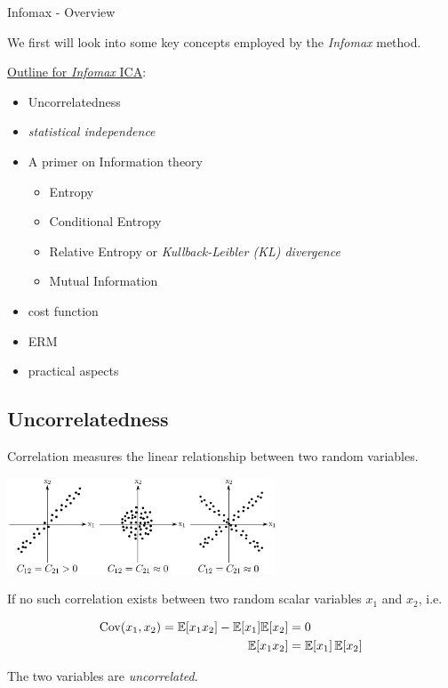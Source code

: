 \begin{frame}{Infomax - Overview}

We first will look into some key concepts employed by the \emph{Infomax} method.

\clearpage

\underline{Outline for \emph{Infomax} ICA}:
\begin{itemize}
    \item Uncorrelatedness
    \item \emph{statistical independence}
    \item A primer on Information theory
    \begin{itemize}
        \item Entropy
        \item Conditional Entropy
        \item Relative Entropy or \emph{Kullback-Leibler (KL) divergence}
        \item Mutual Information
    \end{itemize}
    \item cost function
    \item ERM
    \item practical aspects
\end{itemize}

\end{frame}

\subsection{Uncorrelatedness}

\begin{frame}{\subsecname}

Correlation measures the linear relationship between two random variables.
\begin{center}
\includegraphics[width=0.6\textwidth]{img/section2_fig3.pdf}
\end{center}

If no such correlation exists between two random scalar variables $x_1$ and $x_2$, i.e.

\begin{align}
\label{eq:uncorr}
\mathrm{Cov}(x_1, x_2) = \mathbb{E}  \lbrack x_1  x_2 \rbrack - \mathbb{E}  \lbrack x_1 \rbrack \mathbb{E} \lbrack x_2 \rbrack  &= 0\\
\mathbb{E}  \lbrack x_1  x_2 \rbrack &= \mathbb{E}  \lbrack x_1 \rbrack \, \mathbb{E} \lbrack x_2 \rbrack
\end{align}

The two variables are \emph{uncorrelated}.

\end{frame}

